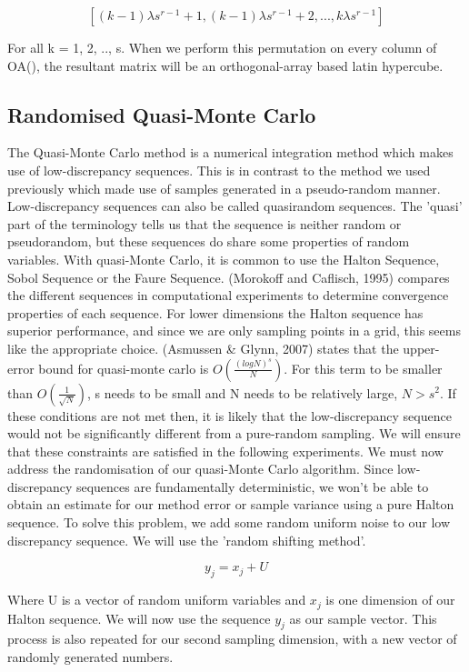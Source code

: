 \documentclass{article}
\begin{document}
    $$[(k-1) \lambda s^{r - 1} + 1, (k-1) \lambda s^{r - 1} + 2, ..., k \lambda s^{r - 1}]$$

    For all k = 1, 2, .., s. When we perform this permutation on every column of OA(), the resultant matrix will be an orthogonal-array based latin hypercube.

    \subsection*{Randomised Quasi-Monte Carlo}
    The Quasi-Monte Carlo method is a numerical integration method which makes use of low-discrepancy sequences. This is in contrast to the method we used previously which made use of samples generated in a pseudo-random manner. Low-discrepancy sequences can also be called quasirandom sequences. The 'quasi' part of the terminology tells us that the sequence is neither random or pseudorandom, but these sequences do share some properties of random variables. With quasi-Monte Carlo, it is common to use the Halton Sequence, Sobol Sequence or the Faure Sequence. (Morokoff and Caflisch, 1995) compares the different sequences in computational experiments to determine convergence properties of each sequence. For lower dimensions the Halton sequence has superior performance, and since we are only sampling points in a grid, this seems like the appropriate choice. (Asmussen & Glynn, 2007) states that the upper-error bound for quasi-monte carlo is $O(\frac{(log N)^s}{N})$. For this term to be smaller than $O(\frac{1}{\sqrt{N}})$, s needs to be small and N needs to be relatively large, $N > s^2$. If these conditions are not met then, it is likely that the low-discrepancy sequence would not be significantly different from a pure-random sampling. We will ensure that these constraints are satisfied in the following experiments.
    We must now address the randomisation of our quasi-Monte Carlo algorithm. Since low-discrepancy sequences are fundamentally deterministic, we won't be able to obtain an estimate for our method error or sample variance using a pure Halton sequence.
    To solve this problem, we add some random uniform noise to our low discrepancy sequence. We will use the 'random shifting method'.

    $$ y_j = x_j + U $$

    Where U is a vector of random uniform variables and $x_j$ is one dimension of our Halton sequence. We will now use the sequence $y_j$ as our sample vector. This process is also repeated for our second sampling dimension, with a new vector of randomly generated numbers.
\end{document}

